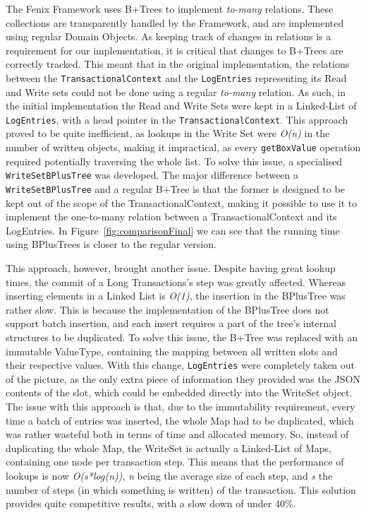 \documentclass{llncs}
\begin{document}
The Fenix Framework uses B+Trees to implement {\it to-many}
relations. These collections are transparently handled by the
Framework, and are implemented using regular Domain Objects. As
keeping track of changes in relations is a requirement for our
implementation, it is critical that changes to B+Trees are correctly
tracked. This meant that in the original implementation, the relations
between the \texttt{TransactionalContext} and the \texttt{LogEntries}
representing its Read and Write sets could not be done using a regular
{\it to-many} relation. As such, in the initial implementation the
Read and Write Sets were kept in a Linked-List of \texttt{LogEntries},
with a head pointer in the \texttt{TransactionalContext}.  This
approach proved to be quite inefficient, as lookups in the Write Set
were {\it O(n)} in the number of written objects, making it
impractical, as every \texttt{getBoxValue} operation required
potentially traversing the whole list. To solve this issue, a
specialised \texttt{WriteSetBPlusTree} was developed. The major
difference between a \texttt{WriteSetBPlusTree} and a regular B+Tree
is that the former is designed to be kept out of the scope of the
TransactionalContext, making it possible to use it to implement the
one-to-many relation between a TransactionalContext and its
LogEntries. In Figure~\ref{fig:comparisonFinal} we can see that the
running time using BPlusTrees is closer to the regular
version. 

This approach, however, brought another issue. Despite having great
lookup times, the commit of a Long Transactions's step was greatly
affected. Whereas inserting elements in a Linked List is {\it O(1)},
the insertion in the BPlusTree was rather slow. This is because the
implementation of the BPlusTree does not support batch insertion, and
each insert requires a part of the tree's internal structures to be
duplicated. To solve this issue, the B+Tree was replaced with an
immutable ValueType, containing the mapping between all written slots
and their respective values. With this change, \texttt{LogEntries}
were completely taken out of the picture, as the only extra piece of
information they provided was the JSON contents of the slot, which
could be embedded directly into the WriteSet object. The issue with
this approach is that, due to the immutability requirement, every time
a batch of entries was inserted, the whole Map had to be duplicated,
which was rather wasteful both in terms of time and allocated
memory. So, instead of duplicating the whole Map, the WriteSet is
actually a Linked-List of Maps, containing one node per transaction
step. This means that the performance of lookups is now {\it
  O(s*log(n))}, {\it n} being the average size of each step, and {\it
  s} the number of steps (in which something is written) of the
transaction. This solution provides quite competitive results, with a
slow down of under 40\%.
\end{document}
